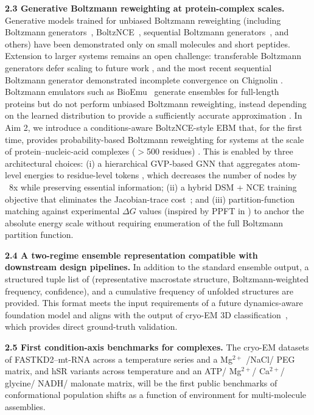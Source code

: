 \documentclass[11pt]{article}
\begin{document}
\textbf{2.3 Generative Boltzmann reweighting at protein-complex scales.} Generative models trained for unbiased Boltzmann reweighting (including Boltzmann generators~\cite{noe_BoltzmannGenerators_2019}, BoltzNCE~\cite{aggarwal_BoltzNCE_2025}, sequential Boltzmann generators~\cite{tan_Scalable_2026}, and others) have been demonstrated only on small molecules and short peptides. Extension to larger systems remains an open challenge: transferable Boltzmann generators defer scaling to future work \cite{diez_BOLTZMANN_2025,chen_CoarseGrained_2026}, and the most recent sequential Boltzmann generator demonstrated incomplete convergence on Chignolin \cite{tan_Scalable_2026}. Boltzmann emulators such as BioEmu~\cite{lewis_Scalable_2025} generate ensembles for full-length proteins but do not perform unbiased Boltzmann reweighting, instead depending on the learned distribution to provide a sufficiently accurate approximation \cite{olsson_Generative_2026}. In Aim 2, we introduce a conditions-aware BoltzNCE-style EBM that, for the first time, provides probability-based Boltzmann reweighting for systems at the scale of protein--nucleic-acid complexes ($>$500 residues) \cite{aggarwal_BoltzNCE_2025}. This is enabled by three architectural choices: (i) a hierarchical GVP-based GNN that aggregates atom-level energies to residue-level tokens \cite{pengmei_Hierarchical_2025}, which decreases the number of nodes by ~8x while preserving essential information; (ii) a hybrid DSM + NCE training objective that eliminates the Jacobian-trace cost~\cite{aggarwal_BoltzNCE_2025}; and (iii) partition-function matching against experimental $\Delta G$ values (inspired by PPFT in \cite{lewis_Scalable_2025}) to anchor the absolute energy scale without requiring enumeration of the full Boltzmann partition function.

\textbf{2.4 A two-regime ensemble representation compatible with downstream design pipelines.} In addition to the standard ensemble output, a structured tuple list of (representative macrostate structure, Boltzmann-weighted frequency, confidence), and a cumulative frequency of unfolded structures are provided. This format meets the input requirements of a future dynamics-aware foundation model and aligns with the output of cryo-EM 3D classification~\cite{punjani_3DVA_2021,punjani_3DFlex_2023,zhong_CryoDRGN_2021}, which provides direct ground-truth validation.

\textbf{2.5 First condition-axis benchmarks for complexes.} The cryo-EM datasets of FASTKD2--mt-RNA across a temperature series and a Mg$^{2+}$ /NaCl/ PEG matrix, and hSR variants across temperature and an ATP/ Mg$^{2+}$/ Ca$^{2+}$/ glycine/ NADH/ malonate matrix, will be the first public benchmarks of conformational population shifts as a function of environment for multi-molecule assemblies.
\end{document}
